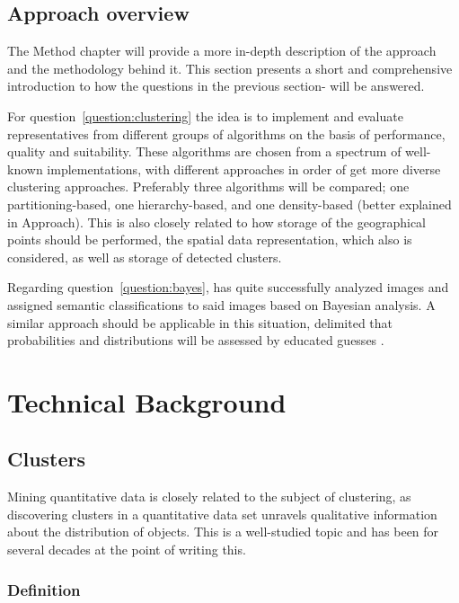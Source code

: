 \subsection{Approach overview}
The Method chapter will provide a more in-depth description of the approach
and the methodology behind it. This section presents a short and comprehensive
introduction to how the questions in the previous section- will be answered.

For question~\ref{question:clustering} the idea is to implement and
evaluate representatives from different 
groups of algorithms on the basis of performance, quality and 
suitability. These algorithms are chosen from a spectrum of well-known 
implementations, with different approaches in order of get more diverse 
clustering approaches. Preferably three algorithms will be compared; one 
partitioning-based, one hierarchy-based, and one density-based (better 
explained in Approach). This is also closely related to how storage of the 
geographical points should be performed, the spatial data representation, 
which also is considered, as well as storage of detected clusters.

Regarding question~\ref{question:bayes}, \citeauthor{content-based-classification} 
has quite successfully analyzed images and assigned 
semantic classifications to said images based on Bayesian analysis. A similar 
approach should be applicable in this situation, delimited that 
probabilities and distributions will be assessed by educated guesses
\cite{content-based-classification, framework-classification}.

\section{Technical Background}

\subsection{Clusters}

Mining quantitative data is closely related to the subject of clustering, 
as discovering clusters in a quantitative data set unravels  
qualitative information about the distribution of objects. This is a 
well-studied topic and has been for several decades at the point of 
writing this.

\subsubsection{Definition}

